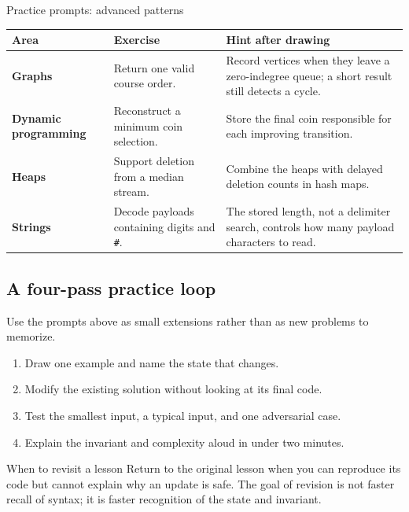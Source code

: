 \begin{revisionbox}{Practice prompts: advanced patterns}
\renewcommand{\arraystretch}{1.12}
\begin{tabularx}{\linewidth}{@{}>{\raggedright\arraybackslash\bfseries}p{2.45cm}
  >{\raggedright\arraybackslash}X
  >{\raggedright\arraybackslash}X@{}}
\toprule
Area & Exercise & Hint after drawing \\
\midrule
Graphs & Return one valid course order. & Record vertices when they leave a
zero-indegree queue; a short result still detects a cycle. \\
Dynamic programming & Reconstruct a minimum coin selection. & Store the final
coin responsible for each improving transition. \\
Heaps & Support deletion from a median stream. & Combine the heaps with delayed
deletion counts in hash maps. \\
Strings & Decode payloads containing digits and \texttt{\#}. & The stored
length, not a delimiter search, controls how many payload characters to read. \\
\bottomrule
\end{tabularx}
\end{revisionbox}

\subsection{A four-pass practice loop}

Use the prompts above as small extensions rather than as new problems to
memorize.

\begin{enumerate}[itemsep=0.3em]
  \item Draw one example and name the state that changes.
  \item Modify the existing solution without looking at its final code.
  \item Test the smallest input, a typical input, and one adversarial case.
  \item Explain the invariant and complexity aloud in under two minutes.
\end{enumerate}

\begin{conceptbox}{When to revisit a lesson}
Return to the original lesson when you can reproduce its code but cannot
explain why an update is safe. The goal of revision is not faster recall of
syntax; it is faster recognition of the state and invariant.
\end{conceptbox}